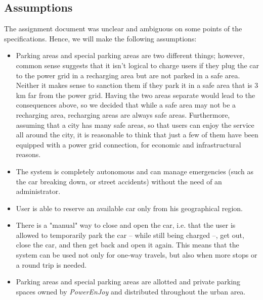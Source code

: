 \documentclass{article}
\begin{document}
		\subsection{Assumptions}
			The assignment document was unclear and ambiguous on some points of the specifications. Hence, we will make the following assumptions:
			
			\begin{itemize}
				\item Parking areas and special parking areas are two different things; however, common sense suggests that it isn't logical to charge users if they plug the car to the power grid in a recharging area but are not parked in a safe area. Neither it makes sense to sanction them if they park it in a safe area that is 3 km far from the power grid. Having the two areas separate would lead to the consequences above, so we decided that while a safe area may not be a recharging area, recharging areas are always safe areas. %
				Furthermore, assuming that a city has many safe areas, so that users can enjoy the service all around the city, it is reasonable to think that just a few of them have been equipped with a power grid connection, for economic and infrastructural reasons.
				
				\item The system is completely autonomous and can manage emergencies (such as the car breaking down, or street accidents) without the need of an administrator. %
				
				\item User is able to reserve an available car only from his geographical region. %
				
				\item There is a "manual" way to close and open the car, i.e. that the user is allowed to temporarily park the car – while still being charged –, get out, close the car, and then get back and open it again. This means that the system can be used not only for one-way travels, but also when more stops or a round trip is needed.
				
				\item Parking areas and special parking areas are allotted and private parking spaces owned by \textit{PowerEnJoy} and distributed throughout the urban area. %
			\end{itemize}
\end{document}
